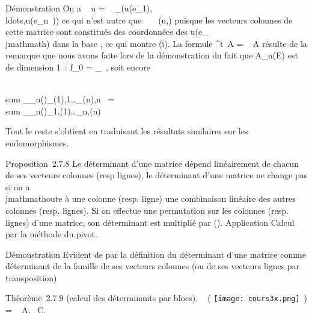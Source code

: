 \documentclass[]{article}
\begin{document}
Démonstration On a
~ u
= ~
_(u(e_1),\\ldots,u(e_n~))
ce qui n'est autre que
~
\mathrmMat~ (u,) puisque
les vecteurs colonnes de cette matrice sont constitués des coordonnées
des u(e_\\jmathmath) dans la base , ce qui montre (i). La formule
 ^t~A
= ~ A résulte de
la remarque que nous avons faite lors de la démonstration du fait que
A_n(E) est de dimension 1~: f_0
=  _~,
soit encore

\\sum
_\sigma\inS_n\epsilon(\sigma)\xi_\sigma(1),1\ldots\xi_\sigma(n),n~
= \\sum
_\sigma\inS_n\epsilon(\sigma)\xi_1,\sigma(1)\ldots\xi_n,\sigma(n)~

Tout le reste s'obtient en traduisant les résultats similaires sur les
endomorphismes.

Proposition~2.7.8 Le déterminant d'une matrice dépend linéairement de
chacun de ses vecteurs colonnes (resp lignes), le déterminant d'une
matrice ne change pas si on a\\jmathmathoute à une colonne (resp. ligne) une
combinaison linéaire des autres colonnes (resp. lignes). Si on effectue
une permutation \sigma sur les colonnes (resp. lignes) d'une matrice, son
déterminant est multiplié par \epsilon(\sigma). Application Calcul par la méthode du
pivot.

Démonstration Evident de par la définition du déterminant d'une matrice
comme déterminant de la famille de ses vecteurs colonnes (ou de ses
vecteurs lignes par transposition)

Théorème~2.7.9 (calcul des déterminants par blocs).
~
\left ( \texttt{[image: cours3x.png]}
\,\right ) = \
A.~ C.
\end{document}
